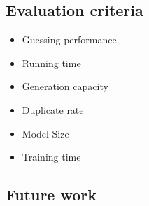%
%        


\hypertarget{evaluation-criteria}{%
\subsection{Evaluation criteria}\label{evaluation-criteria}}

\begin{itemize}
\item
  Guessing performance
\item
  Running time
\item
  Generation capacity
\item
  Duplicate rate
\item
  Model Size
\item
  Training time
\end{itemize}

\hypertarget{future-work}{%
\subsection{Future work}\label{future-work}}

